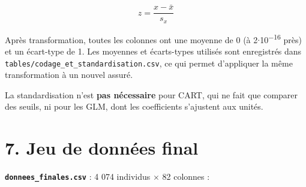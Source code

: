 \documentclass[

  french,

  10pt,

  a4paper,

]{article}
\begin{document}
\[z = \frac{x - \bar{x}}{s_x}\]



Après transformation, toutes les colonnes ont une moyenne de 0 (à 2\ensuremath{\cdot}10\textsuperscript{\ensuremath{-}16} près) et un écart-type de 1. Les moyennes et écarts-types utilisés sont enregistrés dans \texttt{tables/codage\_et\_standardisation.csv}, ce qui permet d'appliquer la même transformation à un nouvel assuré.



La standardisation n'est \textbf{pas nécessaire} pour CART, qui ne fait que comparer des seuils, ni pour les GLM, dont les coefficients s'ajustent aux unités.



\section{7. Jeu de données final}



\textbf{\texttt{donnees\_finales.csv}} : 4 074 individus \ensuremath{\times} 82 colonnes :
\end{document}
